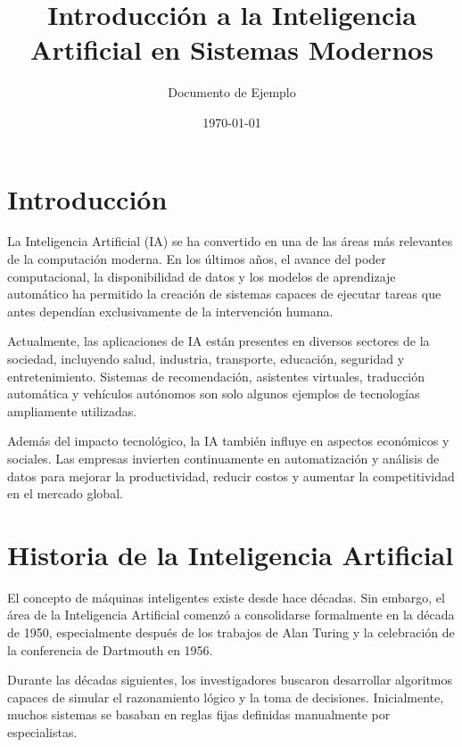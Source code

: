 \documentclass[11pt]{article}
\begin{document}
\title{Introducción a la Inteligencia Artificial en Sistemas Modernos}
\author{Documento de Ejemplo}
\date{\today}
 
\maketitle

\tableofcontents
   
\newpage  

\section{Introducción}

La Inteligencia Artificial (IA) se ha convertido en una de las áreas más relevantes de la computación moderna.
En los últimos años, el avance del poder computacional, la disponibilidad de datos y los modelos
de aprendizaje automático ha permitido la creación de sistemas capaces de ejecutar tareas que
antes dependían exclusivamente de la intervención humana.

Actualmente, las aplicaciones de IA están presentes en diversos sectores de la sociedad, incluyendo salud,
industria, transporte, educación, seguridad y entretenimiento. Sistemas de recomendación,
asistentes virtuales, traducción automática y vehículos autónomos son solo algunos ejemplos
de tecnologías ampliamente utilizadas.

Además del impacto tecnológico, la IA también influye en aspectos económicos y sociales. Las empresas
invierten continuamente en automatización y análisis de datos para mejorar la productividad,
reducir costos y aumentar la competitividad en el mercado global. 

\section{Historia de la Inteligencia Artificial}

El concepto de máquinas inteligentes existe desde hace décadas. Sin embargo, el área de la Inteligencia
Artificial comenzó a consolidarse formalmente en la década de 1950, especialmente después de los
trabajos de Alan Turing y la celebración de la conferencia de Dartmouth en 1956.

Durante las décadas siguientes, los investigadores buscaron desarrollar algoritmos capaces de
simular el razonamiento lógico y la toma de decisiones. Inicialmente, muchos sistemas se basaban en
reglas fijas definidas manualmente por especialistas.
\end{document}
